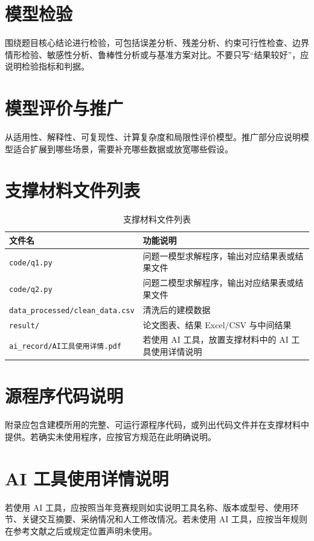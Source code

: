 \documentclass[UTF8,a4paper,zihao=-4]{ctexart}
\begin{document}
\section{模型检验}
围绕题目核心结论进行检验，可包括误差分析、残差分析、约束可行性检查、边界情形检验、敏感性分析、鲁棒性分析或与基准方案对比。不要只写“结果较好”，应说明检验指标和判据。

\section{模型评价与推广}
从适用性、解释性、可复现性、计算复杂度和局限性评价模型。推广部分应说明模型适合扩展到哪些场景，需要补充哪些数据或放宽哪些假设。




\appendix
\section{支撑材料文件列表}
\begin{table}[H]
\centering
\caption{支撑材料文件列表}
\begin{tabularx}{\textwidth}{lX}
\toprule
文件名 & 功能说明 \\
\midrule
\texttt{code/q1.py} & 问题一模型求解程序，输出对应结果表或结果文件 \\
\texttt{code/q2.py} & 问题二模型求解程序，输出对应结果表或结果文件 \\
\texttt{data\_processed/clean\_data.csv} & 清洗后的建模数据 \\
\texttt{result/} & 论文图表、结果 Excel/CSV 与中间结果 \\
\texttt{ai\_record/AI工具使用详情.pdf} & 若使用 AI 工具，放置支撑材料中的 AI 工具使用详情说明 \\
\bottomrule
\end{tabularx}
\end{table}

\section{源程序代码说明}
附录应包含建模所用的完整、可运行源程序代码，或列出代码文件并在支撑材料中提供。若确实未使用程序，应按官方规范在此明确说明。

\section{AI 工具使用详情说明}
若使用 AI 工具，应按照当年竞赛规则如实说明工具名称、版本或型号、使用环节、关键交互摘要、采纳情况和人工修改情况。若未使用 AI 工具，应按当年规则在参考文献之后或规定位置声明未使用。
\end{document}
